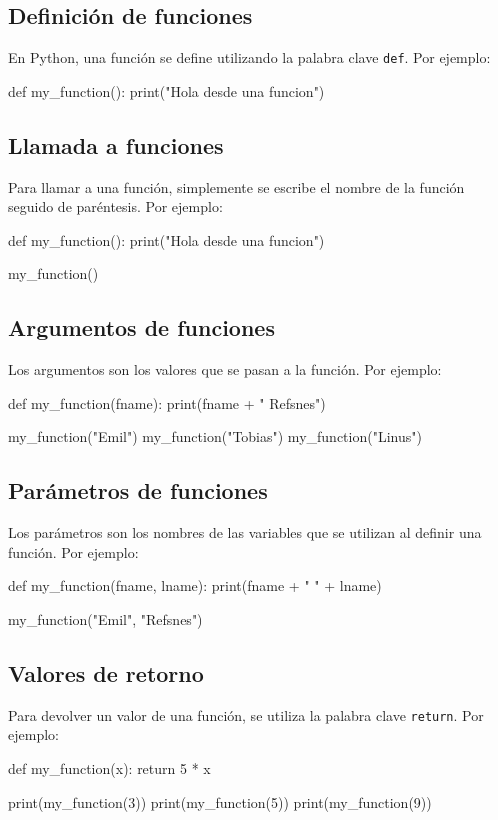 \documentclass{article}
\begin{document}
\subsection{Definición de funciones}
En Python, una función se define utilizando la palabra clave \texttt{def}. Por ejemplo:
\begin{python_code}
def my_function():
  print("Hola desde una funcion")
\end{python_code}
\subsection{Llamada a funciones}
Para llamar a una función, simplemente se escribe el nombre de la función seguido de paréntesis. Por ejemplo:
\begin{python_code}
def my_function():
  print("Hola desde una funcion")

my_function()
\end{python_code}
\subsection{Argumentos de funciones}
Los argumentos son los valores que se pasan a la función. Por ejemplo:
\begin{python_code}
def my_function(fname):
  print(fname + " Refsnes")

my_function("Emil")
my_function("Tobias")
my_function("Linus")
\end{python_code}
\subsection{Parámetros de funciones}
Los parámetros son los nombres de las variables que se utilizan al definir una función. Por ejemplo:
\begin{python_code}
def my_function(fname, lname):
  print(fname + " " + lname)

my_function("Emil", "Refsnes")
\end{python_code}
\subsection{Valores de retorno}
Para devolver un valor de una función, se utiliza la palabra clave \texttt{return}. Por ejemplo:
\begin{python_code}
def my_function(x):
  return 5 * x

print(my_function(3))
print(my_function(5))
print(my_function(9))
\end{python_code}
\end{document}
